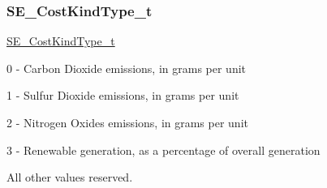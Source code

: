 \subsubsection{\texorpdfstring{S\+E\+\_\+\+Cost\+Kind\+Type\+\_\+t}{SE\_CostKindType\_t}}
{\footnotesize\ttfamily \hyperlink{group__CostKindType_ga7a0a832ce8a138d7ba008379e83b718b}{S\+E\+\_\+\+Cost\+Kind\+Type\+\_\+t}}

0 -\/ Carbon Dioxide emissions, in grams per unit

1 -\/ Sulfur Dioxide emissions, in grams per unit

2 -\/ Nitrogen Oxides emissions, in grams per unit

3 -\/ Renewable generation, as a percentage of overall generation

All other values reserved. 